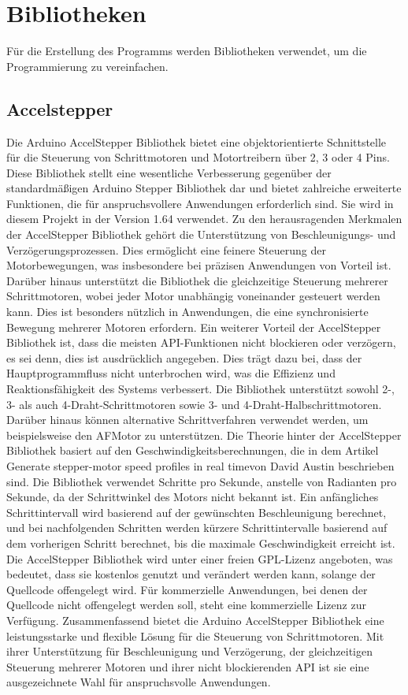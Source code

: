 \section{Bibliotheken}
Für die Erstellung des Programms werden Bibliotheken verwendet, um die Programmierung zu vereinfachen.

\subsection{Accelstepper}

Die Arduino AccelStepper Bibliothek bietet eine objektorientierte Schnittstelle für die Steuerung von Schrittmotoren und Motortreibern über 2, 3 oder 4 Pins. Diese Bibliothek stellt eine wesentliche Verbesserung gegenüber der standardmäßigen Arduino Stepper Bibliothek dar und bietet zahlreiche erweiterte Funktionen, die für anspruchsvollere Anwendungen erforderlich sind. Sie wird in diesem Projekt in der Version 1.64 verwendet. Zu den herausragenden Merkmalen der AccelStepper Bibliothek gehört die Unterstützung von Beschleunigungs- und Verzögerungsprozessen. Dies ermöglicht eine feinere Steuerung der Motorbewegungen, was insbesondere bei präzisen Anwendungen von Vorteil ist. Darüber hinaus unterstützt die Bibliothek die gleichzeitige Steuerung mehrerer Schrittmotoren, wobei jeder Motor unabhängig voneinander gesteuert werden kann. Dies ist besonders nützlich in Anwendungen, die eine synchronisierte Bewegung mehrerer Motoren erfordern. Ein weiterer Vorteil der AccelStepper Bibliothek ist, dass die meisten API-Funktionen nicht blockieren oder verzögern, es sei denn, dies ist ausdrücklich angegeben. Dies trägt dazu bei, dass der Hauptprogrammfluss nicht unterbrochen wird, was die Effizienz und Reaktionsfähigkeit des Systems verbessert. Die Bibliothek unterstützt sowohl 2-, 3- als auch 4-Draht-Schrittmotoren sowie 3- und 4-Draht-Halbschrittmotoren. Darüber hinaus können alternative Schrittverfahren verwendet werden, um beispielsweise den AFMotor zu unterstützen. Die Theorie hinter der AccelStepper Bibliothek basiert auf den Geschwindigkeitsberechnungen, die in dem Artikel \glqq Generate stepper-motor speed profiles in real time\grqq von David Austin beschrieben sind. Die Bibliothek verwendet Schritte pro Sekunde, anstelle von Radianten pro Sekunde, da der Schrittwinkel des Motors nicht bekannt ist. Ein anfängliches Schrittintervall wird basierend auf der gewünschten Beschleunigung berechnet, und bei nachfolgenden Schritten werden kürzere Schrittintervalle basierend auf dem vorherigen Schritt berechnet, bis die maximale Geschwindigkeit erreicht ist. Die AccelStepper Bibliothek wird unter einer freien GPL-Lizenz angeboten, was bedeutet, dass sie kostenlos genutzt und verändert werden kann, solange der Quellcode offengelegt wird. Für kommerzielle Anwendungen, bei denen der Quellcode nicht offengelegt werden soll, steht eine kommerzielle Lizenz zur Verfügung. Zusammenfassend bietet die Arduino AccelStepper Bibliothek eine leistungsstarke und flexible Lösung für die Steuerung von Schrittmotoren. Mit ihrer Unterstützung für Beschleunigung und Verzögerung, der gleichzeitigen Steuerung mehrerer Motoren und ihrer nicht blockierenden API ist sie eine ausgezeichnete Wahl für anspruchsvolle Anwendungen.\cite{MikeMcCauley.2024}

